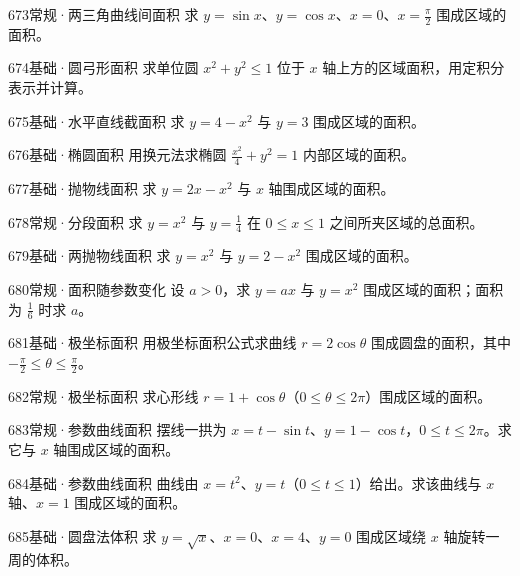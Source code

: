 \begin{exercise}{673}{常规·两三角曲线间面积}
求 $y=\sin x$、$y=\cos x$、$x=0$、$x=\frac{\pi}{2}$ 围成区域的面积。
\end{exercise}
\begin{exercise}{674}{基础·圆弓形面积}
求单位圆 $x^2+y^2\le1$ 位于 $x$ 轴上方的区域面积，用定积分表示并计算。
\end{exercise}
\begin{exercise}{675}{基础·水平直线截面积}
求 $y=4-x^2$ 与 $y=3$ 围成区域的面积。
\end{exercise}
\begin{exercise}{676}{基础·椭圆面积}
用换元法求椭圆 $\frac{x^2}{4}+y^2=1$ 内部区域的面积。
\end{exercise}
\begin{exercise}{677}{基础·抛物线面积}
求 $y=2x-x^2$ 与 $x$ 轴围成区域的面积。
\end{exercise}
\begin{exercise}{678}{常规·分段面积}
求 $y=x^2$ 与 $y=\frac{1}{4}$ 在 $0\le x\le1$ 之间所夹区域的总面积。
\end{exercise}
\begin{exercise}{679}{基础·两抛物线面积}
求 $y=x^2$ 与 $y=2-x^2$ 围成区域的面积。
\end{exercise}
\begin{exercise}{680}{常规·面积随参数变化}
设 $a>0$，求 $y=ax$ 与 $y=x^2$ 围成区域的面积；面积为 $\frac{1}{6}$ 时求 $a$。
\end{exercise}
\begin{exercise}{681}{基础·极坐标面积}
用极坐标面积公式求曲线 $r=2\cos\theta$ 围成圆盘的面积，其中 $-\frac{\pi}{2}\le\theta\le\frac{\pi}{2}$。
\end{exercise}
\begin{exercise}{682}{常规·极坐标面积}
求心形线 $r=1+\cos\theta$（$0\le\theta\le2\pi$）围成区域的面积。
\end{exercise}
\begin{exercise}{683}{常规·参数曲线面积}
摆线一拱为 $x=t-\sin t$、$y=1-\cos t$，$0\le t\le2\pi$。求它与 $x$ 轴围成区域的面积。
\end{exercise}
\begin{exercise}{684}{基础·参数曲线面积}
曲线由 $x=t^2$、$y=t$（$0\le t\le1$）给出。求该曲线与 $x$ 轴、$x=1$ 围成区域的面积。
\end{exercise}
\begin{exercise}{685}{基础·圆盘法体积}
求 $y=\sqrt x$、$x=0$、$x=4$、$y=0$ 围成区域绕 $x$ 轴旋转一周的体积。
\end{exercise}
